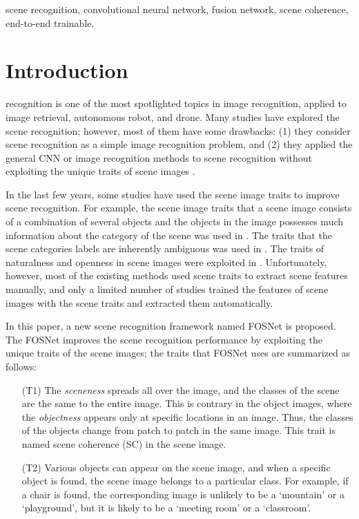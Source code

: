 \documentclass[journal,comsoc]{IEEEtran}
\begin{document}
\begin{IEEEkeywords}
scene recognition, convolutional neural network, fusion network, scene coherence, end-to-end trainable.
\end{IEEEkeywords}






\IEEEpeerreviewmaketitle



\section{Introduction}
\label{s1}
 recognition is one of the most spotlighted topics in image recognition, applied to image retrieval, autonomous robot, and drone. Many studies have explored the scene recognition; however, most of them have some drawbacks: (1) they consider scene recognition as a simple image recognition problem, and (2) they applied the general CNN or image recognition methods to scene recognition without exploiting the unique traits of scene images \cite{b10,b11,b28,b48}.

In the last few years, some studies have used the scene image traits to improve scene recognition. For example, the scene image traits that a scene image consists of a combination of several objects and the objects in the image possesses much information about the category of the scene was used in \cite{b7,b9}. The traits that the scene categories labels are inherently ambiguous was used in \cite{b5}. The traits of naturalness and openness in scene images were exploited in \cite{b3}. Unfortunately, however, most of the existing methods used scene traits to extract scene features manually, and only a limited number of studies trained the features of scene images with the scene traits and extracted them automatically.

In this paper, a new scene recognition framework named FOSNet is proposed. The FOSNet improves the scene recognition performance by exploiting the unique traits of the scene images; the traits that FOSNet uses are summarized as follows:

\begin{enumerate}
\item[(T1)] The \textit{sceneness} spreads all over the image, and the classes of the scene are the same to the entire image. This is contrary in the object images, where the \textit{objectness} appears only at specific locations in an image. Thus, the classes of the objects change from patch to patch in the same image. This trait is named scene coherence (SC) in the scene image.

\item[(T2)] Various objects can appear on the scene image, and when a specific object is found, the scene image belongs to a particular class. For example, if a chair is found, the corresponding image is unlikely to be a `mountain' or a `playground', but it is likely to be a `meeting room' or a `classroom'.
\end{enumerate}
\end{document}
